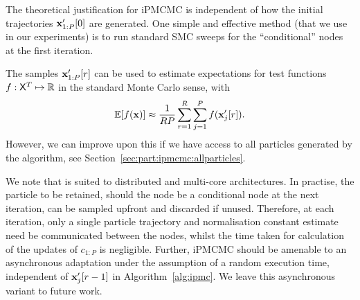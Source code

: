 The theoretical justification for iPMCMC is independent of how the initial trajectories $\mathbf{x}_{1:P}'[0]$ are generated.  One simple and effective method (that we use in our experiments) is to run standard SMC sweeps for the ``conditional'' nodes at the first iteration.

The \ipmc samples $\mathbf{x}_{1:P}'[r]$ can be used to estimate expectations for test functions $f: \mathsf{X}^T \mapsto \mathbb{R}$ in the standard Monte Carlo sense, with
\begin{align}
\label{eq:mcestimate}
\mathbb{E}[f(\mathbf{x})] \approx \frac{1}{RP}\sum_{r=1}^R\sum_{j=1}^P f(\mathbf{x}_j'[r]).
\end{align}
However, we can improve upon this if we have access to all particles generated by the algorithm, see Section~\ref{sec:part:ipmcmc:allparticles}.

We note that \ipmcmc is suited to distributed and multi-core architectures. In practise, the particle to be retained, should the node be a conditional node at the next iteration, can be sampled upfront and discarded if unused.  Therefore, at each iteration, only a single particle trajectory and normalisation constant estimate need be communicated between the nodes, whilst the time taken for calculation of the updates of $c_{1:P}$ is negligible.  Further, iPMCMC should be amenable to an asynchronous adaptation under the assumption of a random execution time, independent of $\mathbf{x}_j'[r-1]$ in Algorithm~\ref{alg:ipmc}. We leave this asynchronous variant to future work.



